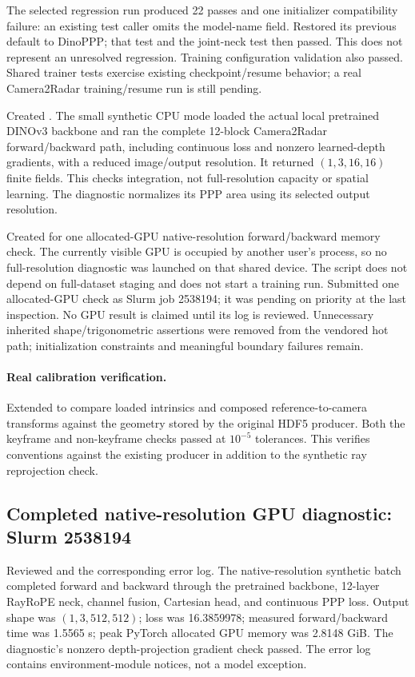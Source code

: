 \documentclass[11pt,a4paper]{article}
\begin{document}
The selected regression run produced 22 passes and one initializer compatibility failure: an existing test caller omits the model-name field. Restored its previous default to DinoPPP; that test and the joint-neck test then passed. This does not represent an unresolved regression. Training configuration validation also passed. Shared trainer tests exercise existing checkpoint/resume behavior; a real Camera2Radar training/resume run is still pending.

Created . The small synthetic CPU mode loaded the actual local pretrained DINOv3 backbone and ran the complete 12-block Camera2Radar forward/backward path, including continuous loss and nonzero learned-depth gradients, with a reduced image/output resolution. It returned $(1,3,16,16)$ finite fields. This checks integration, not full-resolution capacity or spatial learning. The diagnostic normalizes its PPP area using its selected output resolution.

Created  for one allocated-GPU native-resolution forward/backward memory check. The currently visible GPU is occupied by another user's process, so no full-resolution diagnostic was launched on that shared device. The script does not depend on full-dataset staging and does not start a training run. Submitted one allocated-GPU check as Slurm job 2538194; it was pending on priority at the last inspection. No GPU result is claimed until its log is reviewed. Unnecessary inherited shape/trigonometric assertions were removed from the vendored hot path; initialization constraints and meaningful boundary failures remain.

\paragraph{Real calibration verification.}
Extended  to compare loaded intrinsics and composed reference-to-camera transforms against the geometry stored by the original HDF5 producer. Both the keyframe and non-keyframe checks passed at $10^{-5}$ tolerances. This verifies conventions against the existing producer in addition to the synthetic ray reprojection check.

\subsection{Completed native-resolution GPU diagnostic: Slurm 2538194}
Reviewed  and the corresponding error log. The native-resolution synthetic batch completed forward and backward through the pretrained backbone, 12-layer RayRoPE neck, channel fusion, Cartesian head, and continuous PPP loss. Output shape was $(1,3,512,512)$; loss was 16.3859978; measured forward/backward time was 1.5565 s; peak PyTorch allocated GPU memory was 2.8148 GiB. The diagnostic's nonzero depth-projection gradient check passed. The error log contains environment-module notices, not a model exception.
\end{document}
